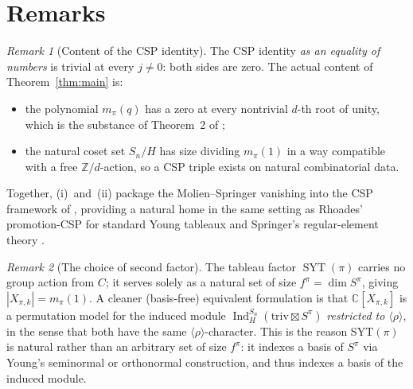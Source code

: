 \documentclass[11pt]{article}
\theoremstyle{definition}
\theoremstyle{remark}
\newtheorem*{remark}{Remark}
\newcommand{\Ind}{\operatorname{Ind}}
\newcommand{\triv}{\mathrm{triv}}
\newcommand{\SYT}{\operatorname{SYT}}
\newcommand{\CC}{\mathbb{C}}
\newcommand{\ZZ}{\mathbb{Z}}
\begin{document}
\section{Remarks}

\begin{remark}[Content of the CSP identity]
The CSP identity \emph{as an equality of numbers} is trivial at every $j \ne 0$: both sides are zero.  The actual content of Theorem~\ref{thm:main} is:
\begin{itemize}
\item[(i)] the polynomial $m_\pi(q)$ has a zero at every nontrivial $d$-th root of unity, which is the substance of Theorem~2 of \cite{Wreath-general-r};
\item[(ii)] the natural coset set $S_n / H$ has size dividing $m_\pi(1)$ in a way compatible with a free $\ZZ/d$-action, so a CSP triple exists on natural combinatorial data.
\end{itemize}
Together, (i)~and~(ii) package the Molien--Springer vanishing into the CSP framework of \cite{RSW}, providing a natural home in the same setting as Rhoades' promotion-CSP for standard Young tableaux \cite{Rhoades} and Springer's regular-element theory \cite{Springer}.
\end{remark}

\begin{remark}[The choice of second factor]
The tableau factor $\SYT(\pi)$ carries no group action from $C$; it serves solely as a natural set of size $f^\pi = \dim S^\pi$, giving $|X_{\pi,k}| = m_\pi(1)$.  A cleaner (basis-free) equivalent formulation is that $\CC[X_{\pi,k}]$ is a permutation model for the induced module $\Ind_H^{S_n}(\triv \boxtimes S^\pi)$ \emph{restricted to $\langle \rho\rangle$}, in the sense that both have the same $\langle\rho\rangle$-character.  This is the reason SYT$(\pi)$ is natural rather than an arbitrary set of size $f^\pi$: it indexes a basis of $S^\pi$ via Young's seminormal or orthonormal construction, and thus indexes a basis of the induced module.
\end{remark}
\end{document}
